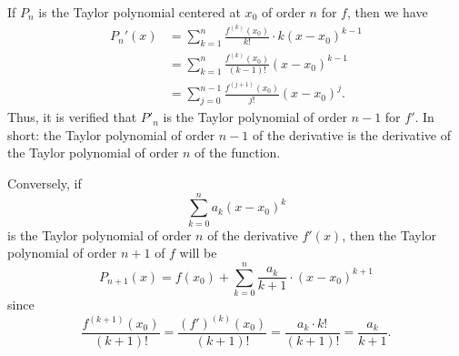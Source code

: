 \begin{remark}
  \label{rem:taylor_derivata}%
If $P_n$ is the Taylor polynomial centered at $x_0$ of order $n$ for $f$, then
we have
\begin{align*}
P_n'(x) &= \sum_{k=1}^{n} \frac{f^{(k)}(x_0)}{k!}\cdot k(x-x_0)^{k-1} \\
  &= \sum_{k=1}^{n} \frac{f^{(k)}(x_0)}{(k-1)!} (x-x_0)^{k-1} \\
  &= \sum_{j=0}^{n-1} \frac{f^{(j+1)}(x_0)}{j!} (x-x_0)^j.
\end{align*}
Thus, it is verified that $P'_n$ is the Taylor polynomial of order $n-1$ for
$f'$.
In short: the Taylor polynomial of order $n-1$ of the derivative is the
derivative
of the Taylor polynomial of order $n$ of the function.

Conversely, if
\[
   \sum_{k=0}^n a_k (x-x_0)^k
\]
is the Taylor polynomial of order $n$ of the derivative $f'(x)$, then
the Taylor polynomial of order $n+1$ of $f$ will be%
\begin{equation}\label{eq:4993725}
  P_{n+1}(x) = f(x_0) + \sum_{k=0}^{n} \frac{a_{k}}{k+1}\cdot (x-x_0)^{k+1}
\end{equation}
since
\[
  \frac{f^{(k+1)}(x_0)}{(k+1)!}
  =\frac{(f')^{(k)}(x_0)}{(k+1)!}
  = \frac{a_k \cdot k!}{ (k+1)!}
  = \frac{a_k}{k+1}.
\]
\end{remark}

